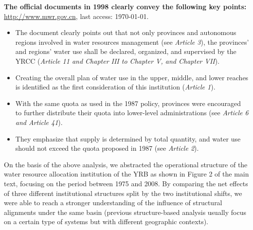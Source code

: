\documentclass{article}
\begin{document}
\textbf{The official documents in 1998 clearly convey the following key points:}
\href{http://www.mwr.gov.cn/ztpd/2013ztbd/2013fxkh/fxkhswcbcs/cs/flfg/201304/t20130411_433489.html}{http://www.mwr.gov.cn}, last access: \today.
\begin{itemize}
	\item The document clearly points out that not only provinces and autonomous regions involved in water resources management (see \textit{Article 3}), the provinces’ and regions’ water use shall be declared, organized, and supervised by the YRCC (\textit{Article 11 and Chapter III to Chapter V, and Chapter VII}).
	\item Creating the overall plan of water use in the upper, middle, and lower reaches is identified as the first consideration of this institution (\textit{Article 1}).
	\item With the same quota as used in the 1987 policy, provinces were encouraged to further distribute their quota into lower-level administrations (see \textit{Article 6 and Article 41}).
	\item They emphasize that supply is determined by total quantity, and water use should not exceed the quota proposed in 1987 (see \textit{Article 2}).
\end{itemize}

On the basis of the above analysis, we abstracted the operational structure of the water resource allocation institution of the YRB as shown in Figure 2 of the main text, focusing on the period between 1975 and 2008. By comparing the net effects of three different institutional structures split by the two institutional shifts, we were able to reach a stronger understanding of the influence of structural alignments under the same basin (previous structure-based analysis usually focus on a certain type of systems but with different geographic contexts).
\end{document}
